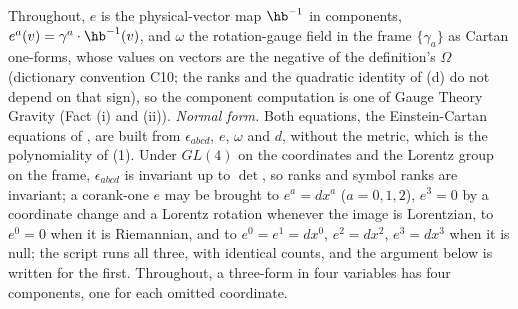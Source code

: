 Throughout, $e$ is the physical-vector map $\hb^{-1}$ in components, $e^a(v) = \gamma^a \cdot \hb^{-1}(v)$, and $\omega$ the rotation-gauge field in the frame $\{\gamma_a\}$ as Cartan one-forms, whose values on vectors are the negative of the definition's $\Omega$ (dictionary convention C10; the ranks and the quadratic identity of (d) do not depend on that sign), so the component computation is one of Gauge Theory Gravity (Fact (i) and (ii)). \emph{Normal form.} Both equations, the Einstein-Cartan equations of , are built from $\epsilon_{abcd}$, $e$, $\omega$ and $d$, without the metric, which is the polynomiality of (1). Under $GL(4)$ on the coordinates and the Lorentz group on the frame, $\epsilon_{abcd}$ is invariant up to $\det$, so ranks and symbol ranks are invariant; a corank-one $e$ may be brought to $e^a = dx^a$ ($a = 0,1,2$), $e^3 = 0$ by a coordinate change and a Lorentz rotation whenever the image is Lorentzian, to $e^0 = 0$ when it is Riemannian, and to $e^0 = e^1 = dx^0$, $e^2 = dx^2$, $e^3 = dx^3$ when it is null; the script runs all three, with identical counts, and the argument below is written for the first. Throughout, a three-form in four variables has four components, one for each omitted coordinate.

